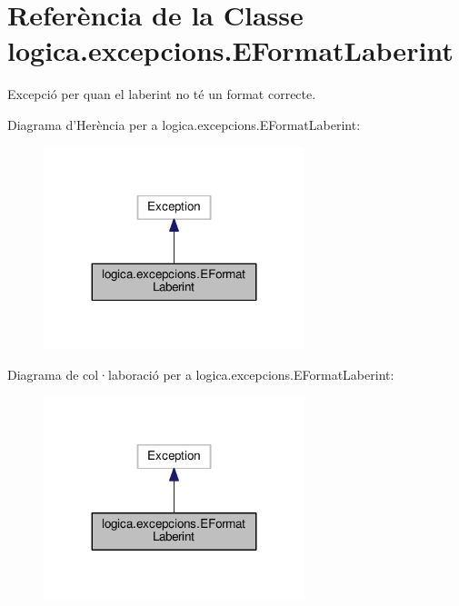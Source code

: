 \hypertarget{classlogica_1_1excepcions_1_1_e_format_laberint}{\section{Referència de la Classe logica.\+excepcions.\+E\+Format\+Laberint}
\label{classlogica_1_1excepcions_1_1_e_format_laberint}
}


Excepció per quan el laberint no té un format correcte.  




Diagrama d'Herència per a logica.\+excepcions.\+E\+Format\+Laberint\+:\nopagebreak
\begin{figure}[H]
\begin{center}
\leavevmode
\includegraphics[width=215pt]{classlogica_1_1excepcions_1_1_e_format_laberint__inherit__graph}
\end{center}
\end{figure}


Diagrama de col·laboració per a logica.\+excepcions.\+E\+Format\+Laberint\+:\nopagebreak
\begin{figure}[H]
\begin{center}
\leavevmode
\includegraphics[width=215pt]{classlogica_1_1excepcions_1_1_e_format_laberint__coll__graph}
\end{center}
\end{figure}
